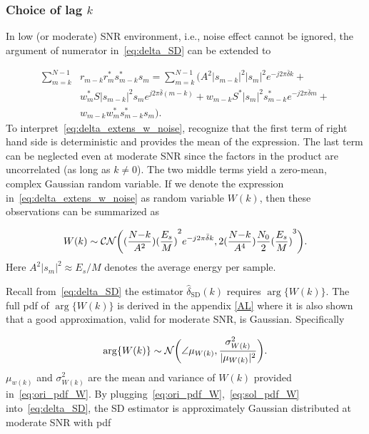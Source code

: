 \subsubsection{Choice of lag $k$}
In low (or moderate) SNR environment, i.e., noise effect cannot be ignored, the argument of numerator in~\eqref{eq:delta_SD} can be extended to 

\begin{equation}
    \label{eq:delta_extens_w_noise}
    \begin{aligned}
      \sum_{m=k}^{N-1}&r_{m-k}r_m^*s_{m-k}^*s_m= \sum_{m=k}^{N-1} \Big( A^2|s_{m-k}|^2|s_m|^2e^{-j2\pi \bar{\delta} k} + \\
      &w_m^* S|s_{m-k}|^2s_m e^{j2\pi \bar{\delta}(m-k)} + w_{m-k}S^*|s_m|^2s_{m-k}^* e^{-j2\pi \bar{\delta} m} + \\
      &w_{m-k}w_m^*s_{m-k}^*s_m \Big) .
    \end{aligned}
    \end{equation}
To interpret~\eqref{eq:delta_extens_w_noise}, recognize that the first term of right hand side is
deterministic and provides the mean of the expression.
The last term can be neglected even at moderate SNR since the
factors in the product are uncorrelated (as long as $k \neq 0$).
The two middle terms yield a zero-mean, complex Gaussian random variable.
If we denote the expression in~\eqref{eq:delta_extens_w_noise} as random variable $W(k)$,
then these observations can be summarized as

\begin{equation}
    \label{eq:ori_pdf_W}
    W(k) \sim \mathcal{CN}\bigg((
    \frac{N{-}k}{A^2}){(\frac{E_s}{M})}^2e^{-j2\pi \bar{\delta} k},
    2(\frac{N{-}k}{A^4})\frac{N_0}{2}{(\frac{E_s}{M})}^3\bigg).
  \end{equation}
Here $A^2|s_m|^2 {\approx} E_s/M$ denotes the average energy per
sample.

Recall from~\eqref{eq:delta_SD} the estimator $\hat{\delta}_{\text{SD}}(k)$ requires $\arg\{W(k)\}$.
The full pdf of $\arg\{W(k)\}$ is derived in the appendix \ref{AL}
where it is also shown that a good approximation, valid for moderate SNR, 
is Gaussian. Specifically 

\begin{equation}
    \label{eq:sol_pdf_W}
    \arg\{W(k)\} \sim \mathcal{N}\bigg(\angle \mu_{W(k)},\frac{\sigma^2_{W(k)}}{|\mu_{W(k)}|^2}\bigg).
  \end{equation}
$\mu_{w(k)}$ and $\sigma^2_{W(k)}$ are the mean and variance of $W(k)$ provided in~\eqref{eq:ori_pdf_W}.
By plugging~\eqref{eq:ori_pdf_W},~\eqref{eq:sol_pdf_W} into~\eqref{eq:delta_SD}, the SD estimator
is approximately Gaussian distributed at moderate SNR with pdf


